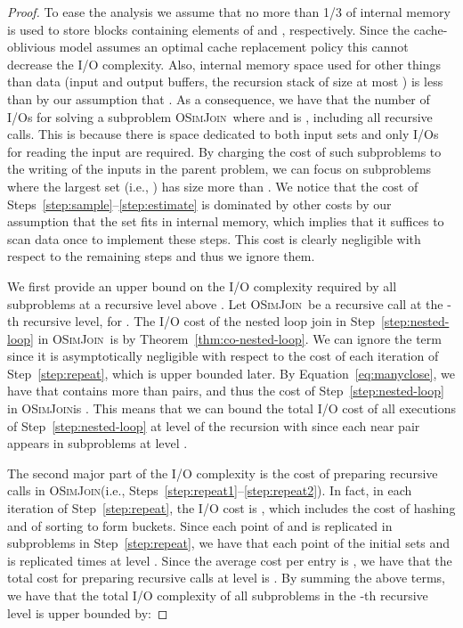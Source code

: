 \documentclass{llncs}
\newcommand{\SimJoin}{\textsc{OSimJoin}}
\begin{document}
\begin{proof} 



To ease the analysis we assume that no more than 1/3 of internal memory is used to store blocks containing elements of  and , respectively. 
Since the cache-oblivious model assumes an optimal cache replacement policy this cannot decrease the I/O complexity. 
Also, internal memory space used for other things than data (input and output buffers, the recursion stack of size at most ) is less than  by our assumption that . 
As a consequence, we have that the number of I/Os for solving a subproblem \SimJoin\  where  and  is , including all recursive calls. 
This is because there is space  dedicated to both input sets and only I/Os for reading the input are required. 
By charging the cost of such subproblems to the writing of the inputs in the parent problem, we can focus on subproblems where the largest set (i.e., ) has size more than .
We notice that the cost of Steps~\ref{step:sample}--\ref{step:estimate} is dominated by other costs by our assumption that the set  fits in internal memory, which implies that it suffices to scan data once to implement these steps. 
This cost is clearly negligible with respect to the remaining steps and thus we ignore them.

We first provide an upper bound on the I/O complexity required  by all subproblems at a recursive level above . 
Let \SimJoin\  be a recursive call at the -th recursive level, for . 
The I/O cost of the nested loop join in Step~\ref{step:nested-loop} in \SimJoin\  is  by Theorem~\ref{thm:co-nested-loop}. 
We can ignore the  term since it is asymptotically negligible with respect to the cost of each iteration of Step~\ref{step:repeat}, which is upper bounded later. 
By Equation~\ref{eq:manyclose}, we have that  contains more than
 pairs, and thus the cost of Step~\ref{step:nested-loop} in \SimJoin is . 
This means that we can bound the total I/O cost of all executions of Step~\ref{step:nested-loop} at level  of the recursion with  since each near pair  appears in   subproblems at level .

The second major part of the I/O complexity is the cost of preparing recursive calls in \SimJoin (i.e., Steps~\ref{step:repeat1}--\ref{step:repeat2}). 
In fact, in each iteration of Step~\ref{step:repeat}, the I/O cost is , which includes the cost of hashing and of sorting to form buckets. 
Since each point of  and  is replicated in  subproblems in Step~\ref{step:repeat}, we have that each point of the initial sets  and  is replicated  times at level . 
Since the average cost per entry is , we have that the total cost for preparing  recursive calls at level
 is .
By summing the above terms, we have that the total I/O complexity of all subproblems in the -th recursive level is upper bounded by:




\end{proof}
\end{document}
